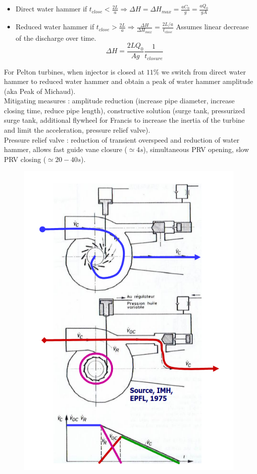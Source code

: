 \documentclass[../main.tex]{subfiles}
\begin{document}
\begin{itemize}
    \item Direct water hammer if $t_{close} < \frac{2L}{a} \Rightarrow \Delta H =\Delta H_{max}= \frac{a C_0}{g} = \frac{aQ_0}{gA}$ 
    \item Reduced water hammer if $t_{close} > \frac{2L}{a} \Rightarrow \frac{\Delta H}{\Delta H_{max}} = \frac{2L/a}{t_{close}}$ \warning Assumes linear decrease of the discharge over time. \begin{equation}
        \Delta H = \frac{2L Q_0}{Ag} \frac{1}{t_{closure}}
    \end{equation} 
\end{itemize}

For Pelton turbines, when injector is closed at $11\%$ we switch from direct water hammer to reduced water hammer and obtain a peak of water hammer amplitude (aka Peak of Michaud).\\

Mitigating measures : amplitude reduction (increase pipe diameter, increase closing time, reduce pipe length), constructive solution (surge tank, pressurized surge tank, additional flywheel for Francis to increase the inertia of the turbine and limit the acceleration, pressure relief valve).\\

Pressure relief valve : reduction of transient overspeed and reduction of water hammer, allows fast guide vane closure ($\simeq 4s$), simultaneous PRV opening, slow PRV closing ($\simeq 20-40s$). 

\begin{figure}[hbt!]
    \centering
    \includegraphics[width=0.7\linewidth]{IMAGES/Hydraulic/Screenshot from 2025-03-14 12-02-39.png}
\end{figure}
\end{document}
